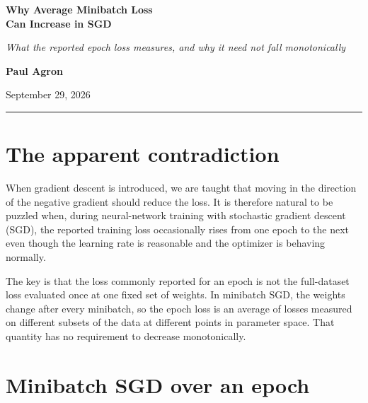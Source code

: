 \documentclass[11pt]{article}
\begin{document}
\begin{center}
\vspace*{-1.0em}
{\color{deepblue}\selectfont\bfseries\fontsize{25}{29}\selectfont
Why Average Minibatch Loss\\[0.08em]
Can Increase in SGD\par}
\vspace{0.60em}
{\large{}\selectfont\color{black!65}\itshape
What the reported epoch loss measures, and why it need not fall monotonically\par}
\vspace{0.62em}
{\selectfont\large\bfseries\color{black!82} Paul Agron\par}
\vspace{0.14em}
{\selectfont\small\color{black!60} September 29, 2026\par}
\vspace{0.62em}
{\color{deepblue}\rule{0.44\linewidth}{0.8pt}}
\end{center}
\vspace{0.9em}

\section{The apparent contradiction}

When gradient descent is introduced, we are taught that moving in the direction of the negative gradient should reduce the loss.  It is therefore natural to be puzzled when, during neural-network training with stochastic gradient descent (SGD), the reported training loss occasionally rises from one epoch to the next even though the learning rate is reasonable and the optimizer is behaving normally.

The key is that the loss commonly reported for an epoch is not the full-dataset loss evaluated once at one fixed set of weights.  In minibatch SGD, the weights change after every minibatch, so the epoch loss is an average of losses measured on different subsets of the data at different points in parameter space.  That quantity has no requirement to decrease monotonically.

\section{Minibatch SGD over an epoch}
\end{document}
